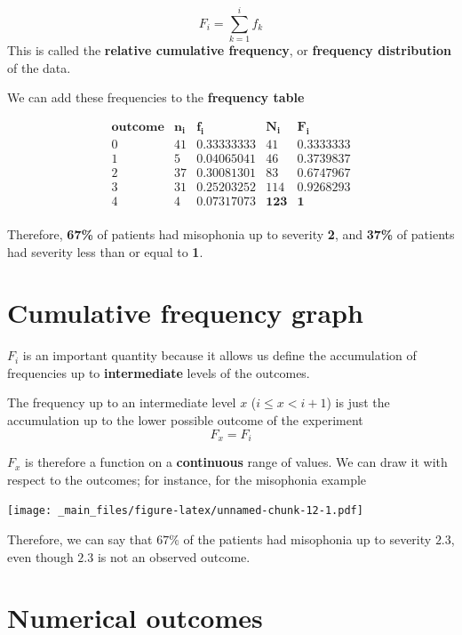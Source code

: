 \documentclass[
]{book}
\begin{document}
\[F_i =\sum_{k= 1}^i f_k\]
This is called the \textbf{relative cumulative frequency}, or \textbf{frequency distribution} of the data.

We can add these frequencies to the \textbf{frequency table}

\[
\begin{array}{ccccc}
\mathbf{outcome} & \mathbf{n_i} & \mathbf{f_i} & \mathbf{N_i} & \mathbf{F_i}\\
0   & 41    & 0.33333333  & 41 & 0.3333333\\
1   & 5     & 0.04065041  & 46 & 0.3739837\\
2   & 37    & 0.30081301  & 83 & 0.6747967\\ 
3   & 31    & 0.25203252  & 114& 0.9268293\\
4   & 4     & 0.07317073  & \mathbf{123} & \mathbf{1}\\ \end{array}
\]

Therefore, \textbf{67\%} of patients had misophonia up to severity \textbf{2}, and \textbf{37\%} of patients had severity less than or equal to \textbf{1}.

\hypertarget{cumulative-frequency-graph}{%
\section{Cumulative frequency graph}\label{cumulative-frequency-graph}}

\(F_i\) is an important quantity because it allows us define the accumulation of frequencies up to \textbf{intermediate} levels of the outcomes.

The frequency up to an intermediate level \(x\) (\(i\leq x< i+1\)) is just the accumulation up to the lower possible outcome of the experiment \[F_x = F_i\]

\(F_x\) is therefore a function on a \textbf{continuous} range of values. We can draw it with respect to the outcomes; for instance, for the misophonia example

\texttt{[image: \_main\_files/figure-latex/unnamed-chunk-12-1.pdf]}

Therefore, we can say that \textbf{\(67\%\)} of the patients had misophonia up to severity \(2.3\), even though \(2.3\) is not an observed outcome.

\hypertarget{numerical-outcomes}{%
\section{Numerical outcomes}\label{numerical-outcomes}}
\end{document}
